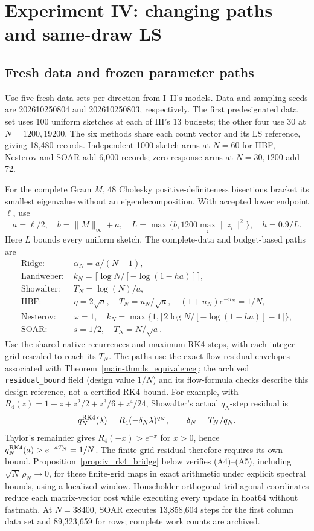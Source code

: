 \documentclass[11pt,a4paper,leqno]{article}
\numberwithin{equation}{section}
\numberwithin{figure}{section}
\numberwithin{table}{section}
\theoremstyle{plain}
\theoremstyle{definition}
\theoremstyle{remark}
\begin{document}
\section{Experiment IV: changing paths and same-draw LS}
\label{supp:sec:native_exp4}
\label{supp:sec:v7_numerics}
\subsection{Fresh data and frozen parameter paths}
\label{supp:subsec:simulation_settings}
Use five fresh data sets per direction from I--II's models. Data and sampling
seeds are 202610250804 and 202610250803, respectively. The first predesignated data set
uses 100 uniform sketches at each of III's 13 budgets; the other four
use 30 at $N=1200,19200$. The six methods share each count vector and
its LS reference, giving 18,480 records. Independent 1000-sketch arms
at $N=60$ for HBF, Nesterov and SOAR add 6,000 records; zero-response
arms at $N=30,1200$ add 72.

\label{supp:subsec:ls_paths}
For the complete Gram $M$, 48 Cholesky positive-definiteness bisections
bracket its smallest eigenvalue without an eigendecomposition. With accepted
lower endpoint $\ell$, use
\[
 a=\ell/2,\quad b=\|M\|_\infty+a,\quad
 L=\max\{b,1200\max_i\|z_i\|^2\},\quad h=0.9/L.
\]
Here $L$ bounds every uniform sketch. The complete-data and budget-based paths are
\begin{align*}
 \text{Ridge: }&\alpha_N=a/(N-1),\\
 \text{Landweber: }&k_N=\lceil\log N/[-\log(1-ha)]\rceil,\\
 \text{Showalter: }&T_N=\log(N)/a,\\
 \text{HBF: }&\eta=2\sqrt a,\quad T_N=u_N/\sqrt a,
              \quad(1+u_N)e^{-u_N}=1/N,\\
 \text{Nesterov: }&\omega=1,\quad
 k_N=\max\{1,\lceil2\log N/[-\log(1-ha)]-1\rceil\},\\
 \text{SOAR: }&s=1/2,\quad T_N=N/\sqrt a.
\end{align*}
Use the shared native recurrences and maximum RK4 steps, with each integer
grid rescaled to reach its $T_N$. The paths use the exact-flow residual
envelopes associated with Theorem~\ref{main-thm:ls_equivalence}; the archived
\texttt{residual\_bound} field (design value $1/N$) and its flow-formula checks describe this
design reference, not a certified RK4 bound. For example, with
$R_4(z)=1+z+z^2/2+z^3/6+z^4/24$, Showalter's actual $q_N$-step residual is
\[
 q^{\rm RK4}_N(\lambda)=R_4(-\delta_N\lambda)^{q_N},\qquad
 \delta_N=T_N/q_N.
\]
Taylor's remainder gives $R_4(-x)>e^{-x}$ for $x>0$, hence
$q^{\rm RK4}_N(a)>e^{-aT_N}=1/N$. The finite-grid residual therefore
requires its own bound. Proposition~\ref{prop:iv_rk4_bridge} below
verifies (A4)--(A5), including $\sqrt N\,\rho_N\to0$, for these finite-grid
maps in exact arithmetic under explicit spectral bounds, using a localized window.
Householder orthogonal tridiagonal coordinates reduce each matrix-vector
cost while executing every update in float64 without fastmath.
At $N=38400$, SOAR executes 13,858,604 steps for the first column data set
and 89,323,659 for rows; complete work counts are archived.
\end{document}
